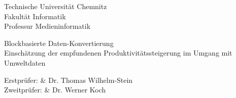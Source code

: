 \begin{tuctitlepage}
  \begin{tuctitleorgunit}
    Technische Universität Chemnitz \\
    Fakultät Informatik \\
    Professur Medieninformatik \\
  \end{tuctitleorgunit}

  \tuctitlelogo

  \bigskip
  \bigskip

  \vspace*{0pt plus 2fill}
  \begin{tuctitletopic}
    Blockbasierte Daten-Konvertierung \\
    \large{Einschätzung der empfundenen Produktivitätssteigerung im Umgang mit Umweltdaten}
  \end{tuctitletopic}
  \vspace*{0pt plus 2fill}

  \begin{tuctitletable}[\bfseries]{1}
    Erstprüfer:  & Dr. Thomas Wilhelm-Stein \\
    Zweitprüfer: & Dr. Werner Koch \\
  \end{tuctitletable}

  \vspace*{0pt plus 1fill}

\end{tuctitlepage}
